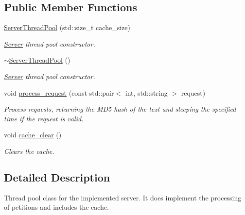 \subsection*{Public Member Functions}
\begin{DoxyCompactItemize}
\item 
\hyperlink{classServerThreadPool_a2da6753b0170d337851425975763bbf9}{Server\+Thread\+Pool} (std\+::size\+\_\+t cache\+\_\+size)
\begin{DoxyCompactList}\small\item\em \hyperlink{classServer}{Server} thread pool constructor. \end{DoxyCompactList}\item 
\mbox{\label{classServerThreadPool_a45205b1fb0646e472e3dbb8bd7a6a9e9}} 
\hyperlink{classServerThreadPool_a45205b1fb0646e472e3dbb8bd7a6a9e9}{$\sim$\+Server\+Thread\+Pool} ()
\begin{DoxyCompactList}\small\item\em \hyperlink{classServer}{Server} thread pool constructor. \end{DoxyCompactList}\item 
\mbox{\label{classServerThreadPool_a93e08ed8efb10e755235f6d480f3a37c}} 
void \hyperlink{classServerThreadPool_a93e08ed8efb10e755235f6d480f3a37c}{process\+\_\+request} (const std\+::pair$<$ int, std\+::string $>$ request)
\begin{DoxyCompactList}\small\item\em Process requests, returning the M\+D5 hash of the text and sleeping the specified time if the request is valid. \end{DoxyCompactList}\item 
\mbox{\label{classServerThreadPool_ad41b2e8022a99e2479020708f50aea39}} 
void \hyperlink{classServerThreadPool_ad41b2e8022a99e2479020708f50aea39}{cache\+\_\+clear} ()
\begin{DoxyCompactList}\small\item\em Clears the cache. \end{DoxyCompactList}\end{DoxyCompactItemize}


\subsection{Detailed Description}
Thread pool class for the implemented server. It does implement the processing of petitions and includes the cache. 

